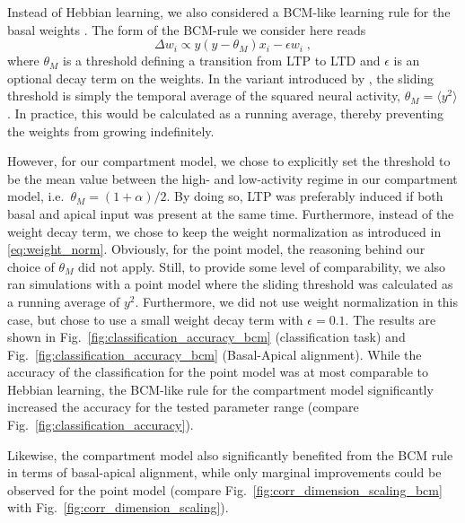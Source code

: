 \documentclass[10pt,a4paper,twocolumn]{article}
\begin{document}
		Instead of Hebbian learning, we also considered a BCM-like
		learning rule for the basal weights \citep{Bienenstock1982,Intrator1992}.
		The form of the BCM-rule we consider here reads
		\begin{equation}
		\Delta w_i \propto y\left(y - \theta_M\right) x_i - \epsilon w_i \; ,
		\end{equation}
		where $\theta_M$ is a threshold defining a transition from LTP to LTD and
		$\epsilon$ is an optional decay term on the weights.
		In the variant introduced by \citet{Law1994}, the sliding threshold is simply
		the temporal average of the squared neural activity, 
		$\theta_M = \langle y^2 \rangle$. In practice, this would be calculated
		as a running average, thereby preventing the weights from growing 
		indefinitely.
		
		However, for our compartment model, we chose to explicitly set the
		threshold to be the mean value between the high- and low-activity regime
		in our compartment model, i.e.\ $\theta_M = (1+\alpha)/2$. By doing so, LTP was
		preferably induced if both basal and apical input was present at the same
		time. Furthermore, instead of the weight decay term, we chose to keep
		the weight normalization as introduced in \eqref{eq:weight_norm}.
		Obviously, for the point model, the reasoning behind our choice of
		$\theta_M$ did not apply. Still, to provide some level of comparability,
		we also ran simulations with a point model where the sliding threshold was
		calculated as a running average of $y^2$. Furthermore, we did not use
		weight normalization in this case, but chose to use a small weight decay term
		with $\epsilon = 0.1$. The results are shown in 
		Fig.~\ref{fig:classification_accuracy_bcm} (classification task) and 
		Fig.~\ref{fig:classification_accuracy_bcm} (Basal-Apical alignment). 
		While the accuracy of the classification for the point model
		was at most comparable to Hebbian learning, the BCM-like rule for the 
		compartment model significantly increased the accuracy for the tested
		parameter range (compare Fig.~\ref{fig:classification_accuracy}).
		
		Likewise, the compartment model also significantly benefited from
		the BCM rule in terms of basal-apical alignment, while only marginal
		improvements could be observed for the point model
		(compare Fig.~\ref{fig:corr_dimension_scaling_bcm} 
		with Fig.~\ref{fig:corr_dimension_scaling}).
		
\end{document}
